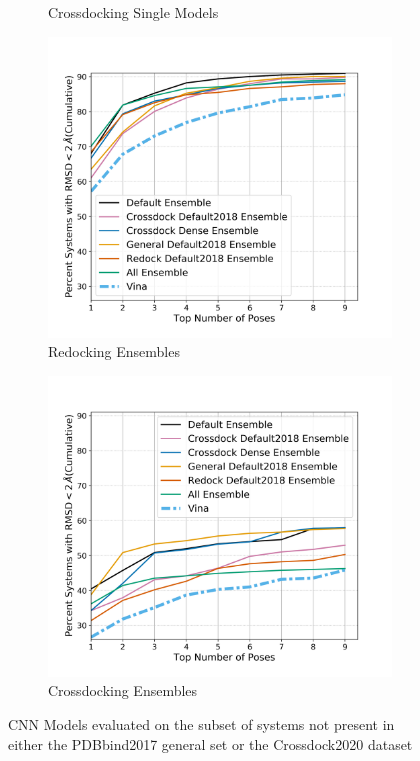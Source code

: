 \documentclass[journal=jcisd8,manuscript=article]{achemso}
\begin{document}
\begin{figure}
\begin{subfigure}[b]{0.48\textwidth}
		\caption{Crossdocking Single Models}
		\label{fig:No2017NoCD20SingleCD}
        \end{subfigure}
        \hfill
        \begin{subfigure}[b]{0.48\textwidth}    
		\centering
		\includegraphics[width=\textwidth]{figures/redocking/ensemble_models_no2017_nocd2020_line.png}
		\caption{Redocking Ensembles}
		\label{fig:No2017NoCD20EnsRD}
        \end{subfigure}    
        \begin{subfigure}[b]{0.48\textwidth}    
		\centering
		\includegraphics[width=\textwidth]{figures/crossdocking/ensemble_models_no2017_nocd2020_line.png}
		\caption{Crossdocking Ensembles}
		\label{fig:No2017NoCD20EnsRD}
        \end{subfigure}
	\caption{CNN Models evaluated on the subset of systems not present in either the PDBbind2017 general set or the Crossdock2020 dataset}
	\label{fig:No2017NoCD20}
\end{figure}  
\end{document}
